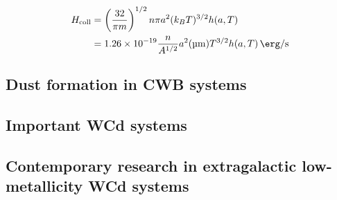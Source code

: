 \begin{equation}
  \begin{split}
    H_\text{coll} & = \left(\frac{32}{\pi m}\right)^{1/2} n\pi a^2 (k_B T)^{3/2} h(a,T) \\
    & = \num{1.26e-19} \frac{n}{A^{1/2}} a^2 (\si{\micro\metre}) T^{3/2} h(a,T) \, \si{\erg\per\second}
  \end{split}
\end{equation}







\subsection{Dust formation in CWB systems}
\label{sec:cwbdust}





\subsection{Important WCd systems}

\subsection{Contemporary research in extragalactic low-metallicity WCd systems}

\label{sec:knowndustysystems}

